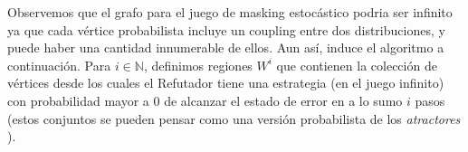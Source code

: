 Observemos que el grafo para el juego de masking estocástico podria ser infinito ya que cada vértice probabilista incluye un coupling entre dos distribuciones, y puede haber una cantidad innumerable de ellos.
Aun así, induce el algoritmo a continuación.
%
Para $i\in \mathbb{N}$, definimos regiones $W^i$ que contienen la colección de vértices desde los cuales el Refutador tiene una estrategia (en el juego infinito) con probabilidad mayor a $0$ de alcanzar el estado de error en a lo sumo $i$ pasos (estos conjuntos se pueden pensar como una versión probabilista de los \emph{atractores} \cite{Jurd11}).


